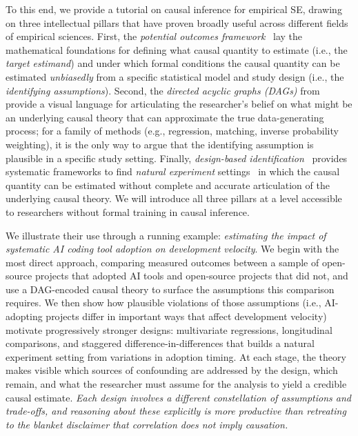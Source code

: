 To this end, we provide a tutorial on causal inference for empirical SE, drawing on three intellectual pillars that have proven broadly useful across different fields of empirical sciences.
First, the \emph{potential outcomes framework}~\cite{neyman1923application, rubin1974estimating} lay the mathematical foundations for defining what causal quantity to estimate (i.e., the \emph{target estimand}) and under which formal conditions the causal quantity can be estimated \emph{unbiasedly} from a specific statistical model and study design (i.e., the \emph{identifying assumptions}).
Second, the \emph{directed acyclic graphs (DAGs)} from \citet{pearl2009causality} provide a visual language for articulating the researcher's belief on what might be an underlying causal theory that can approximate the true data-generating process; for a family of methods (e.g., regression, matching, inverse probability weighting), it is the only way to argue that the identifying assumption is plausible in a specific study setting.
Finally, \emph{design-based identification}~\cite{angrist2010credibility, cunningham2021causal} provides systematic frameworks to find \emph{natural experiment} settings~\cite{dunning2012natural} in which the causal quantity can be estimated without complete and accurate articulation of the underlying causal theory.
We will introduce all three pillars at a level accessible to researchers without formal training in causal inference.

We illustrate their use through a running example: \emph{estimating the impact of systematic AI coding tool adoption on development velocity}.
We begin with the most direct approach, comparing measured outcomes between a sample of open-source projects that adopted AI tools and open-source projects that did not, and use a DAG-encoded causal theory to surface the assumptions this comparison requires. 
We then show how plausible violations of those assumptions (i.e., AI-adopting projects differ in important ways that affect development velocity) motivate progressively stronger designs: multivariate regressions, longitudinal comparisons, and staggered difference-in-differences that builds a natural experiment setting from variations in adoption timing. 
At each stage, the theory makes visible which sources of confounding are addressed by the design, which remain, and what the researcher must assume for the analysis to yield a credible causal estimate. 
\emph{Each design involves a different constellation of assumptions and trade-offs, and reasoning about these explicitly is more productive than retreating to the blanket disclaimer that correlation does not imply causation.}

